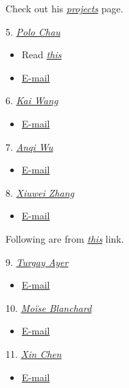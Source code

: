 Check out his \href{https://f-t-s.github.io/projects/}{\emph{projects}} page.

5. \href{https://poloclub.github.io/polochau/}{\emph{Polo Chau}}
\begin{itemize}
    \item Read \href{https://poloclub.github.io/faq.html}{\emph{this}}
    \item \href{mailto:polo@gatech.edu}{E-mail}
\end{itemize}

6. \href{https://guaguakai.com/}{\emph{Kai Wang}}
\begin{itemize}
    \item \href{mailto:kaiwang.gua@gmail.com}{E-mail}
\end{itemize}

7. \href{https://sites.google.com/site/anqiwuresearch/}{\emph{Anqi Wu}}
\begin{itemize}
    \item \href{mailto:anqiwu@gatech.edu}{E-mail}
\end{itemize}

8. \href{https://xiuweizhang.wordpress.com/}{\emph{Xiuwei Zhang}}
\begin{itemize}
    \item \href{mailto:xiuwei.zhang@gatech.edu}{E-mail}
\end{itemize}

Following are from \href{https://www.isye.gatech.edu/research/isye-fields-specialization/analytics-and-machine-learning}{\emph{this}} link.

9. \href{https://sites.gatech.edu/turgay-ayer/}{\emph{Turgay Ayer}}
\begin{itemize}
    \item \href{mailto:ayer@isye.gatech.edu}{E-mail}
\end{itemize}

10. \href{https://moiseb.github.io/}{\emph{Moïse Blanchard}}
\begin{itemize}
    \item \href{mailto:mblanchard41@gatech.edu}{E-mail}
\end{itemize}

\pagebreak

11. \href{https://sites.gatech.edu/xin-chen/}{\emph{Xin Chen}}
\begin{itemize}
    \item \href{mailto:xchen908@gatech.edu}{E-mail}
\end{itemize}

